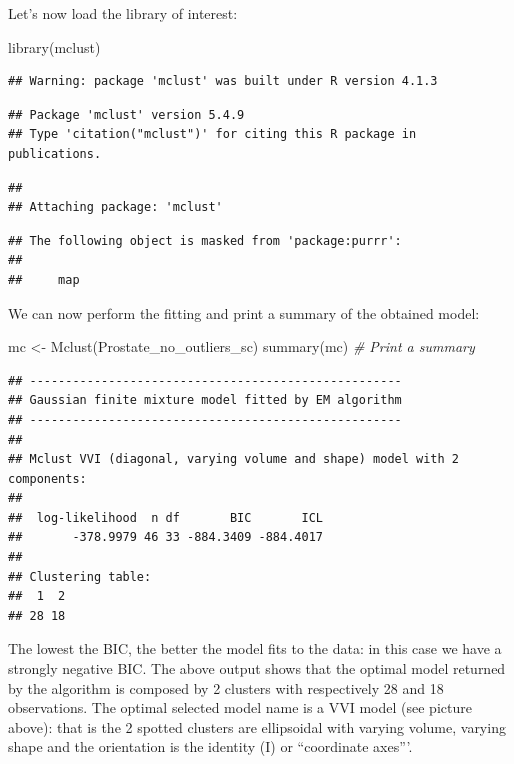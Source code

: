 \documentclass[
]{article}
\newenvironment{Shaded}{\begin{snugshade}}{\end{snugshade}}
\newcommand{\CommentTok}[1]{\textcolor[rgb]{0.56,0.35,0.01}{\textit{#1}}}
\newcommand{\FunctionTok}[1]{\textcolor[rgb]{0.00,0.00,0.00}{#1}}
\newcommand{\NormalTok}[1]{#1}
\newcommand{\OtherTok}[1]{\textcolor[rgb]{0.56,0.35,0.01}{#1}}
\begin{document}
Let's now load the library of interest:

\begin{Shaded}
\begin{Highlighting}[]
\FunctionTok{library}\NormalTok{(mclust)}
\end{Highlighting}
\end{Shaded}

\begin{verbatim}
## Warning: package 'mclust' was built under R version 4.1.3
\end{verbatim}

\begin{verbatim}
## Package 'mclust' version 5.4.9
## Type 'citation("mclust")' for citing this R package in publications.
\end{verbatim}

\begin{verbatim}
## 
## Attaching package: 'mclust'
\end{verbatim}

\begin{verbatim}
## The following object is masked from 'package:purrr':
## 
##     map
\end{verbatim}

We can now perform the fitting and print a summary of the obtained
model:

\begin{Shaded}
\begin{Highlighting}[]
\NormalTok{mc }\OtherTok{\textless{}{-}} \FunctionTok{Mclust}\NormalTok{(Prostate\_no\_outliers\_sc)}
\FunctionTok{summary}\NormalTok{(mc) }\CommentTok{\# Print a summary}
\end{Highlighting}
\end{Shaded}

\begin{verbatim}
## ---------------------------------------------------- 
## Gaussian finite mixture model fitted by EM algorithm 
## ---------------------------------------------------- 
## 
## Mclust VVI (diagonal, varying volume and shape) model with 2 components: 
## 
##  log-likelihood  n df       BIC       ICL
##       -378.9979 46 33 -884.3409 -884.4017
## 
## Clustering table:
##  1  2 
## 28 18
\end{verbatim}

The lowest the BIC, the better the model fits to the data: in this case
we have a strongly negative BIC. The above output shows that the optimal
model returned by the algorithm is composed by 2 clusters with
respectively 28 and 18 observations. The optimal selected model name is
a VVI model (see picture above): that is the 2 spotted clusters are
ellipsoidal with varying volume, varying shape and the orientation is
the identity (I) or ``coordinate axes'''.
\end{document}
